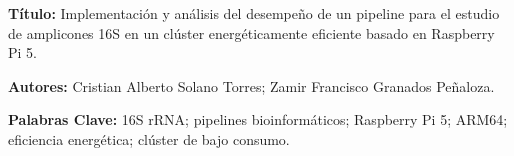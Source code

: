 \documentclass[12pt,oneside,spanish]{book}
\begin{document}
    \vspace{1cm}
    
    \noindent\textbf{Título:} Implementación y análisis del desempeño de un pipeline para el estudio de amplicones 16S en un clúster energéticamente eficiente basado en Raspberry Pi 5.
    
    \medskip
    
    \noindent\textbf{Autores:} Cristian Alberto Solano Torres; Zamir Francisco Granados Peñaloza.
    
    \medskip
    
    \noindent\textbf{Palabras Clave:} 16S rRNA; pipelines bioinformáticos; Raspberry Pi 5; ARM64; eficiencia energética; clúster de bajo consumo.
    
    \vspace{0.5cm}
    
\end{document}
